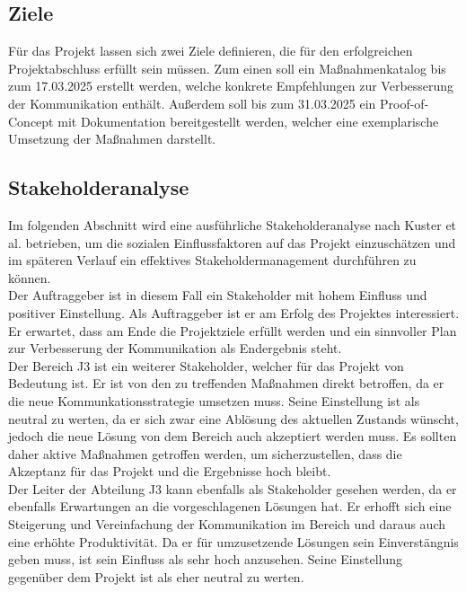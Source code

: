 \documentclass[ThesisDJ.tex]{subfiles}
\begin{document}
	\subsection{Ziele}
  Für das Projekt lassen sich zwei Ziele definieren, die für den erfolgreichen Projektabschluss erfüllt sein müssen.
  Zum einen soll ein Maßnahmenkatalog bis zum 17.03.2025 erstellt werden, welche konkrete Empfehlungen zur Verbesserung der Kommunikation
  enthält. Außerdem soll bis zum 31.03.2025 ein Proof-of-Concept mit Dokumentation bereitgestellt werden, welcher eine exemplarische Umsetzung
  der Maßnahmen darstellt. 

  \subsection{Stakeholderanalyse}
  Im folgenden Abschnitt wird eine ausführliche Stakeholderanalyse nach Kuster et al. \cite[S.~86ff]{kuster_handbuch_2022} betrieben, um die sozialen Einflussfaktoren
  auf das Projekt einzuschätzen und im späteren Verlauf ein effektives Stakeholdermanagement durchführen zu können. \\

  Der Auftraggeber ist in diesem Fall ein Stakeholder mit hohem Einfluss und positiver Einstellung. Als Auftraggeber ist er 
  am Erfolg des Projektes interessiert. Er erwartet, dass am Ende die Projektziele erfüllt werden und ein sinnvoller Plan zur Verbesserung 
  der Kommunikation als Endergebnis steht. \\

  Der Bereich J3 ist ein weiterer Stakeholder, welcher für das Projekt von Bedeutung ist. Er ist von den zu treffenden Maßnahmen direkt 
  betroffen, da er die neue Kommunkationsstrategie umsetzen muss. Seine Einstellung ist als neutral zu werten, da er sich zwar eine 
  Ablösung des aktuellen Zustands wünscht, jedoch die neue Lösung von dem Bereich auch akzeptiert werden muss. Es sollten daher aktive 
  Maßnahmen getroffen werden, um sicherzustellen, dass die Akzeptanz für das Projekt und die Ergebnisse hoch bleibt. \\

  Der Leiter der Abteilung J3 kann ebenfalls als Stakeholder gesehen werden, da er ebenfalls Erwartungen an die vorgeschlagenen Lösungen hat.
  Er erhofft sich eine Steigerung und Vereinfachung der Kommunikation im Bereich und daraus auch eine erhöhte Produktivität. Da er für 
  umzusetzende Lösungen sein Einverstängnis geben muss, ist sein Einfluss als sehr hoch anzusehen. Seine Einstellung gegenüber dem Projekt 
  ist als eher neutral zu werten. \\
\end{document}
